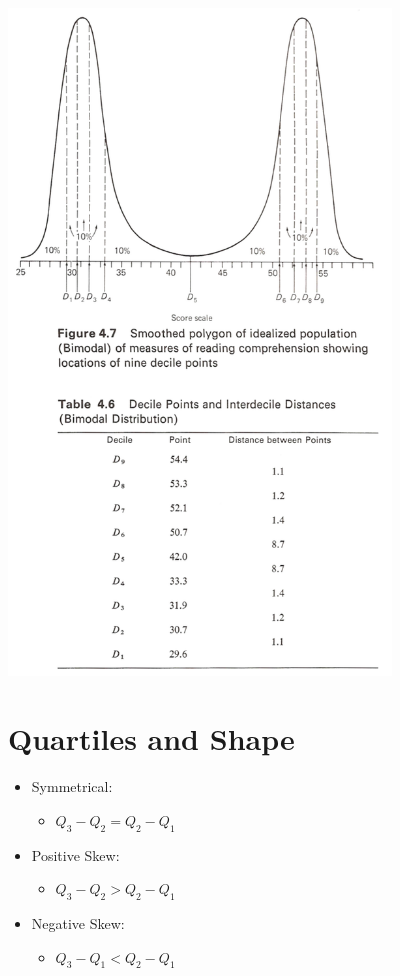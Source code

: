 \documentclass[12pt]{article}
\begin{document}
\includegraphics[width=4in]{Decile_Bimodal.png}

\section{Quartiles and Shape}\label{quartiles-and-shape}

\begin{itemize}
\itemsep1pt\parskip0pt
\item
  Symmetrical:

  \begin{itemize}
  \itemsep1pt\parskip0pt
  \item
    \(Q_{3} - Q_{2} = Q_{2} - Q_{1}\)
  \end{itemize}
\item
  Positive Skew:

  \begin{itemize}
  \itemsep1pt\parskip0pt
  \item
    \(Q_{3} - Q_{2} > Q_{2} - Q_{1}\)
  \end{itemize}
\item
  Negative Skew:

  \begin{itemize}
  \itemsep1pt\parskip0pt
  \item
    \(Q_{3} - Q_{1} < Q_{2} - Q_{1}\)
  \end{itemize}
\end{itemize}
\end{document}
